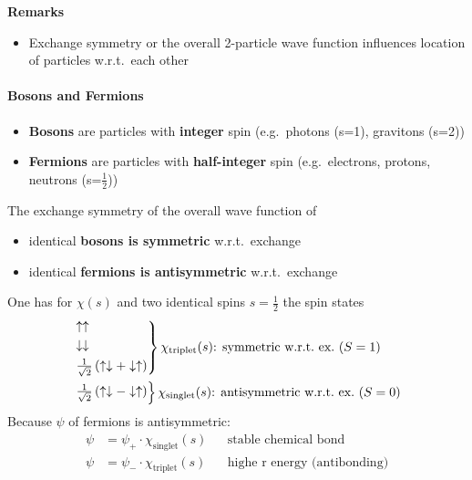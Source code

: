 \textbf{Remarks}
\begin{itemize}
    \item Exchange symmetry or the overall 2-particle wave function influences location of particles w.r.t.\ each other
\end{itemize}

\paragraph{Bosons and Fermions}
\begin{itemize}
    \item \textbf{Bosons} are particles with \textbf{integer} spin (e.g.\ photons (s=1), gravitons (s=2))
    \item \textbf{Fermions} are particles with \textbf{half-integer} spin (e.g.\ electrons, protons, neutrons (s=$\frac{1}{2}$))
\end{itemize}

\newpar{}

The exchange symmetry of the overall wave function of
\begin{itemize}
    \item identical \textbf{bosons is symmetric} w.r.t.\ exchange
    \item identical \textbf{fermions is antisymmetric} w.r.t.\ exchange
\end{itemize}

\newpar{}

One has for $\chi(s)$ and two identical spins $s=\frac{1}{2}$ the spin states
\begin{align*}
     & \begin{rcases}
           \uparrow \uparrow                                                        \\
           \downarrow \downarrow                                                    \\
           \frac{1}{\sqrt{2}}\left(\uparrow \downarrow + \downarrow \uparrow\right) \\
       \end{rcases} \chi_{\mathrm{triplet}}(s)\text{: symmetric w.r.t.\ ex.\ } (S=1) \\
     & \begin{rcases}
           \frac{1}{\sqrt{2}}\left(\uparrow \downarrow - \downarrow \uparrow\right)
       \end{rcases} \chi_{\mathrm{singlet}}(s) \text{: antisymmetric w.r.t.\ ex.\ } (S=0)
\end{align*}
Because $\psi$ of fermions is antisymmetric:
\noindent\begin{align*}
    \psi & = \psi_{+}\cdot \chi_{\mathrm{singlet}}(s) &  & \text{stable chemical bond}         \\
    \psi & = \psi_{-}\cdot \chi_{\mathrm{triplet}}(s) &  & \text{highe r energy (antibonding)}
\end{align*}

